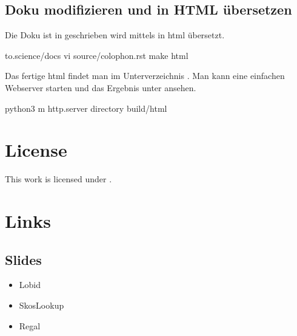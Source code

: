 \documentclass[letterpaper,10pt,english]{sphinxmanual}
\begin{document}
\section{Doku modifizieren und in HTML übersetzen}
\label{\detokenize{colophon:doku-modifizieren-und-in-html-ubersetzen}}\label{\detokenize{colophon:id4}}
\sphinxAtStartPar
Die Doku ist in  geschrieben wird mittels  in html übersetzt.

\begin{sphinxVerbatim}[commandchars=\\\{\}]
\PYGZdl{}  to.science/docs
\PYGZdl{} vi source/colophon.rst
\PYGZdl{} make html
\end{sphinxVerbatim}

\sphinxAtStartPar
Das fertige html findet man im Unterverzeichnis . Man kann eine einfachen Webserver starten und das Ergebnis
unter  ansehen.

\begin{sphinxVerbatim}[commandchars=\\\{\}]
\PYGZdl{} python3 \PYGZhy{}m http.server \PYGZhy{}\PYGZhy{}directory build/html
\end{sphinxVerbatim}


\chapter{License}
\label{\detokenize{colophon:license}}\label{\detokenize{colophon:id5}}
\noindent{}

\sphinxAtStartPar
This work is licensed under .


\chapter{Links}
\label{\detokenize{colophon:links}}\label{\detokenize{colophon:id6}}

\section{Slides}
\label{\detokenize{colophon:slides}}\label{\detokenize{colophon:id7}}\begin{itemize}
\item {} 
\sphinxAtStartPar
Lobid \sphinxhyphen{} 

\item {} 
\sphinxAtStartPar
Skos\sphinxhyphen{}Lookup \sphinxhyphen{} 

\item {} 
\sphinxAtStartPar
Regal \sphinxhyphen{} 

\end{itemize}
\end{document}
